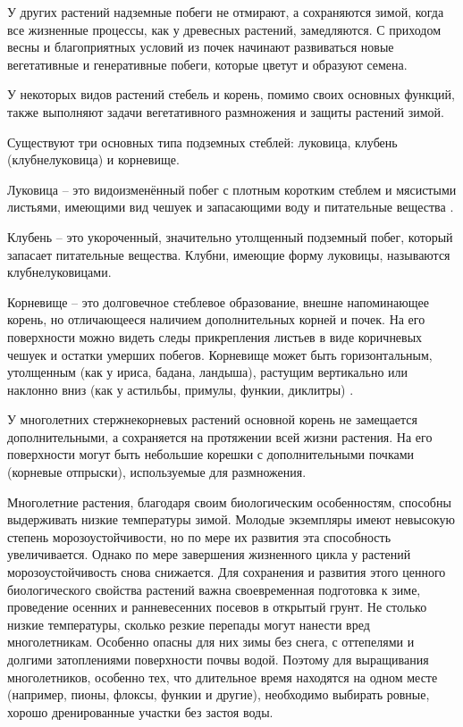 У других растений надземные побеги не отмирают, а сохраняются зимой, когда все жизненные процессы, как у древесных растений, замедляются. С приходом весны и благоприятных условий из почек начинают развиваться новые вегетативные и генеративные побеги, которые цветут и образуют семена.

У некоторых видов растений стебель и корень, помимо своих основных функций, также выполняют задачи вегетативного размножения и защиты растений зимой.

Существуют три основных типа подземных стеблей: луковица, клубень (клубнелуковица) и корневище.

Луковица – это видоизменённый побег с плотным коротким стеблем и мясистыми листьями, имеющими вид чешуек и запасающими воду и питательные вещества \cite{belyaevskaya}.

Клубень -- это укороченный, значительно утолщенный подземный побег, который запасает питательные вещества. Клубни, имеющие форму луковицы, называются клубнелуковицами.

Корневище -- это долговечное стеблевое образование, внешне напоминающее корень, но отличающееся наличием дополнительных корней и почек. На его поверхности можно видеть следы прикрепления листьев в виде коричневых чешуек и остатки умерших побегов. Корневище может быть горизонтальным, утолщенным (как у ириса, бадана, ландыша), растущим вертикально или наклонно вниз (как у астильбы, примулы, функии, диклитры) \cite{aldohina}.

У многолетних стержнекорневых растений основной корень не замещается дополнительными, а сохраняется на протяжении всей жизни растения. На его поверхности могут быть небольшие корешки с дополнительными почками (корневые отпрыски), используемые для размножения.

Многолетние растения, благодаря своим биологическим особенностям, способны выдерживать низкие температуры зимой. Молодые экземпляры имеют невысокую степень морозоустойчивости, но по мере их развития эта способность увеличивается. Однако по мере завершения жизненного цикла у растений морозоустойчивость снова снижается. Для сохранения и развития этого ценного биологического свойства растений важна своевременная подготовка к зиме, проведение осенних и ранневесенних посевов в открытый грунт. Не столько низкие температуры, сколько резкие перепады могут нанести вред многолетникам. Особенно опасны для них зимы без снега, с оттепелями и долгими затоплениями поверхности почвы водой. Поэтому для выращивания многолетников, особенно тех, что длительное время находятся на одном месте (например, пионы, флоксы, функии и другие), необходимо выбирать ровные, хорошо дренированные участки без застоя воды.

